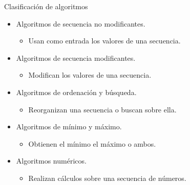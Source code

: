 \begin{frame}[t]{Clasificación de algoritmos}
\begin{itemize}
  \item Algoritmos de secuencia no modificantes.
    \begin{itemize}
      \item Usan como entrada los valores de una secuencia.
    \end{itemize}
  \item Algoritmos de secuencia modificantes.
    \begin{itemize}
      \item Modifican los valores de una secuencia.
    \end{itemize}
  \item Algoritmos de ordenación y búsqueda.
    \begin{itemize}
      \item Reorganizan una secuencia o buscan sobre ella.
    \end{itemize}
  \item Algoritmos de mínimo y máximo.
    \begin{itemize}
      \item Obtienen el mínimo el máximo o ambos.
    \end{itemize}
  \item Algoritmos numéricos.
    \begin{itemize}
      \item Realizan cálculos sobre una secuencia de números.
    \end{itemize}
\end{itemize}
\end{frame}
